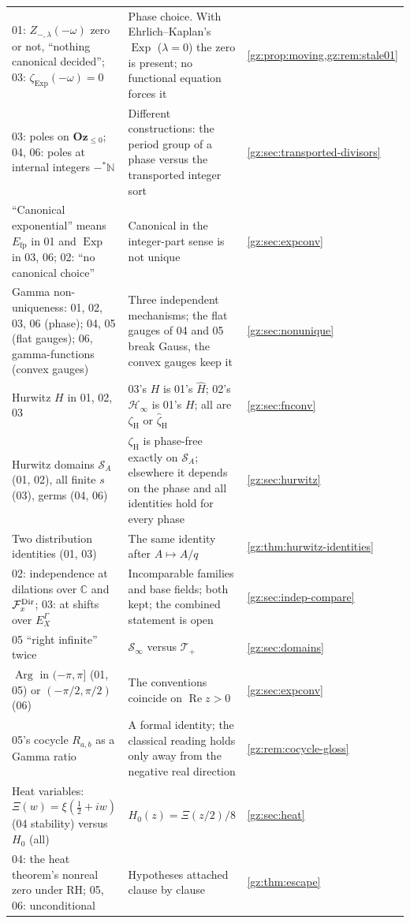\documentclass[11pt,a4paper]{article}
\numberwithin{equation}{section}
\theoremstyle{definition}
\theoremstyle{remark}
\newcommand{\Oz}{\mathbf{Oz}}
\newcommand{\C}{\mathbb C}
\newcommand{\N}{\mathbb N}
\renewcommand{\Re}{\operatorname{Re}}
\newcommand{\Arg}{\operatorname{Arg}}
\newcommand{\Exp}{\operatorname{Exp}}
\newcommand{\Efp}{E_{\mathrm{fp}}}
\newcommand{\zH}{\zeta_{\mathrm H}}
\newcommand{\zHh}{\widehat\zeta_{\mathrm H}}
\newcommand{\Tp}{\mathcal T_{+}}
\newcommand{\Sinf}{\mathcal S_{\infty}}
\newcommand{\SA}{\mathcal S_{A}}
\begin{document}
\begin{center}
\begin{longtable}{@{}P{0.30\textwidth}P{0.44\textwidth}P{0.18\textwidth}@{}}
01: $Z_{-,\lambda}(-\omega)$ zero or not, ``nothing canonical decided''; 03: $\zeta_{\Exp}(-\omega)=0$ & Phase choice. With Ehrlich--Kaplan's $\Exp$ ($\lambda=0$) the zero is present; no functional equation forces it & \cref{gz:prop:moving,gz:rem:stale01}\\
03: poles on $\Oz_{\le0}$; 04, 06: poles at internal integers $-{}^*\N$ & Different constructions: the period group of a phase versus the transported integer sort & \cref{gz:sec:transported-divisors}\\
``Canonical exponential'' means $\Efp$ in 01 and $\Exp$ in 03, 06; 02: ``no canonical choice'' & Canonical in the integer-part sense is not unique & \cref{gz:sec:expconv}\\
Gamma non-uniqueness: 01, 02, 03, 06 (phase); 04, 05 (flat gauges); 06, gamma-functions (convex gauges) & Three independent mechanisms; the flat gauges of 04 and 05 break Gauss, the convex gauges keep it & \cref{gz:sec:nonunique}\\
Hurwitz $H$ in 01, 02, 03 & 03's $H$ is 01's $\widehat H$; 02's $\mathcal H_\infty$ is 01's $H$; all are $\zH$ or $\zHh$ & \cref{gz:sec:fnconv}\\
Hurwitz domains $\SA$ (01, 02), all finite $s$ (03), germs (04, 06) & $\zH$ is phase-free exactly on $\SA$; elsewhere it depends on the phase and all identities hold for every phase & \cref{gz:sec:hurwitz}\\
Two distribution identities (01, 03) & The same identity after $A\mapsto A/q$ & \cref{gz:thm:hurwitz-identities}\\
02: independence at dilations over $\C$ and $\mathcal F_x^{\rm Dir}$; 03: at shifts over $E_X^\Gamma$ & Incomparable families and base fields; both kept; the combined statement is open & \cref{gz:sec:indep-compare}\\
05 ``right infinite'' twice & $\Sinf$ versus $\Tp$ & \cref{gz:sec:domains}\\
$\Arg$ in $(-\pi,\pi]$ (01, 05) or $(-\pi/2,\pi/2)$ (06) & The conventions coincide on $\Re z>0$ & \cref{gz:sec:expconv}\\
05's cocycle $R_{a,b}$ as a Gamma ratio & A formal identity; the classical reading holds only away from the negative real direction & \cref{gz:rem:cocycle-gloss}\\
Heat variables: $\Xi(w)=\xi(\tfrac12+iw)$ (04 stability) versus $H_0$ (all) & $H_0(z)=\Xi(z/2)/8$ & \cref{gz:sec:heat}\\
04: the heat theorem's nonreal zero under RH; 05, 06: unconditional & Hypotheses attached clause by clause & \cref{gz:thm:escape}\\

\end{longtable}
\end{center}
\end{document}
